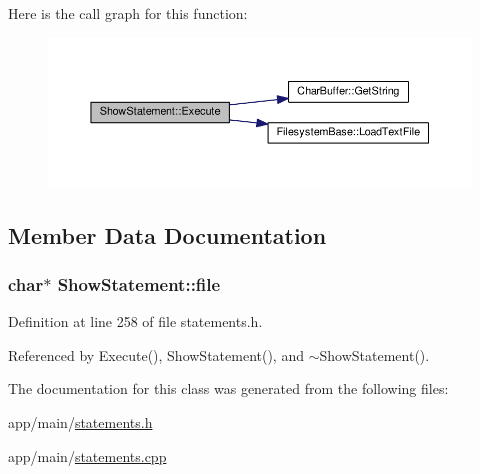 Here is the call graph for this function\+:
\nopagebreak
\begin{figure}[H]
\begin{center}
\leavevmode
\includegraphics[width=350pt]{d5/dc4/classShowStatement_a8466ad7e0e61918cda0e399713abb6a8_cgraph}
\end{center}
\end{figure}




\subsection{Member Data Documentation}
\subsubsection[{\texorpdfstring{file}{file}}]{\setlength{\rightskip}{0pt plus 5cm}char$\ast$ Show\+Statement\+::file\hspace{0.3cm}{\ttfamily [private]}}\hypertarget{classShowStatement_a2f2e42fedd30adf1fee5f68dabcd1f3f}{}\label{classShowStatement_a2f2e42fedd30adf1fee5f68dabcd1f3f}


Definition at line 258 of file statements.\+h.



Referenced by Execute(), Show\+Statement(), and $\sim$\+Show\+Statement().



The documentation for this class was generated from the following files\+:\begin{DoxyCompactItemize}
\item 
app/main/\hyperlink{statements_8h}{statements.\+h}\item 
app/main/\hyperlink{statements_8cpp}{statements.\+cpp}\end{DoxyCompactItemize}

